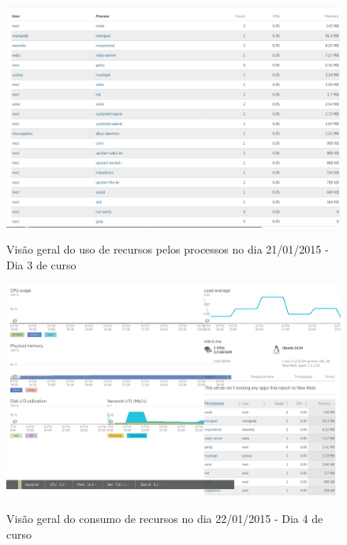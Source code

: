 \documentclass[
	12pt,				%
	oneside,			%
	a4paper,			%
	english,			%
	brazil				%
	]{abntex2ppgsi}
\begin{document}
\begin{apendicesenv}
\begin{figure}[ht]
\centering
\caption{Visão geral do uso de recursos pelos processos no dia 21/01/2015 - Dia 3 de curso}
\includegraphics[page=2,width=1.0\textwidth]{relatorios/21-01-15/process-inspector_cropped.pdf} 
\label{fig:recursos_dia1_5} 
\end{figure}




\begin{figure}[ht]
\centering
\caption{Visão geral do consumo de recursos no dia 22/01/2015 - Dia 4 de curso}
\includegraphics[width=1.0\textwidth]{relatorios/22-01-15/dashboard_cropped.pdf} 
\label{fig:recursos_dia1_1} 
\end{figure}


\end{apendicesenv}
\end{document}
